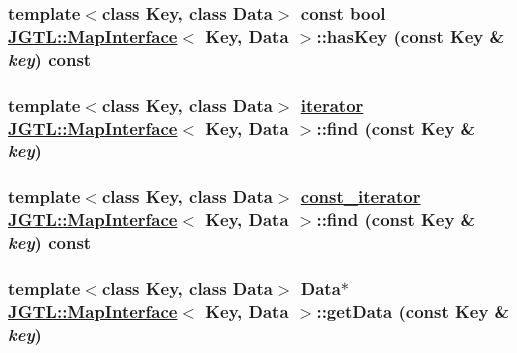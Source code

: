 \hypertarget{class_j_g_t_l_1_1_map_interface_6a4c3571cb30d168d4a67dd2655a6b77}{
\subsubsection[hasKey]{\setlength{\rightskip}{0pt plus 5cm}template$<$class Key, class Data$>$ const bool \hyperlink{class_j_g_t_l_1_1_map_interface}{JGTL::Map\-Interface}$<$ Key, Data $>$::has\-Key (const Key \& {\em key}) const}}
\label{class_j_g_t_l_1_1_map_interface_6a4c3571cb30d168d4a67dd2655a6b77}


\hypertarget{class_j_g_t_l_1_1_map_interface_7e97b54c29a253bd99caf2b0decb95a8}{
\subsubsection[find]{\setlength{\rightskip}{0pt plus 5cm}template$<$class Key, class Data$>$ \hyperlink{class_j_g_t_l_1_1_map_interface_a8fcdbd899d0df84ce1aaa67d8dc000e}{iterator} \hyperlink{class_j_g_t_l_1_1_map_interface}{JGTL::Map\-Interface}$<$ Key, Data $>$::find (const Key \& {\em key})}}
\label{class_j_g_t_l_1_1_map_interface_7e97b54c29a253bd99caf2b0decb95a8}


\hypertarget{class_j_g_t_l_1_1_map_interface_4ec2d9323c3d2e65179c38ea7558a222}{
\subsubsection[find]{\setlength{\rightskip}{0pt plus 5cm}template$<$class Key, class Data$>$ \hyperlink{class_j_g_t_l_1_1_map_interface_bbce6cc516069a5a504e0ae5b9aecd88}{const\_\-iterator} \hyperlink{class_j_g_t_l_1_1_map_interface}{JGTL::Map\-Interface}$<$ Key, Data $>$::find (const Key \& {\em key}) const}}
\label{class_j_g_t_l_1_1_map_interface_4ec2d9323c3d2e65179c38ea7558a222}


\hypertarget{class_j_g_t_l_1_1_map_interface_b18a78bcb6d8ebac123e934aaa3fad0b}{
\subsubsection[getData]{\setlength{\rightskip}{0pt plus 5cm}template$<$class Key, class Data$>$ Data$\ast$ \hyperlink{class_j_g_t_l_1_1_map_interface}{JGTL::Map\-Interface}$<$ Key, Data $>$::get\-Data (const Key \& {\em key})}}
\label{class_j_g_t_l_1_1_map_interface_b18a78bcb6d8ebac123e934aaa3fad0b}


